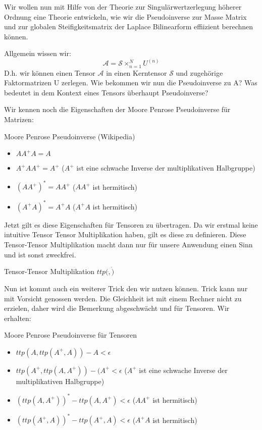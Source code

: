 Wir wollen nun mit Hilfe von der Theorie zur Singulärwertzerlegung höherer Ordnung eine Theorie entwickeln, wie wir die Pseudoinverse zur Masse Matrix und zur globalen Steifigkeitsmatrix der Laplace Bilinearform effiizient berechnen können.

Allgemein wissen wir:
\begin{equation}
\mathcal{A} = \mathcal{S} \times_{n=1}^{N} U^{ (n) }
\end{equation}
D.h. wir können einen Tensor $\mathcal{A}$ in einen Kerntensor $\mathcal{S}$ und zugehörige Faktormatrizen U zerlegen. Wie bekommen wir nun die Pseudoinverse zu A? Was bedeutet in dem Kontext eines Tensors überhaupt Pseudoinverse?

Wir kennen noch die Eigenschaften der Moore Penrose Pseudoinverse für Matrizen:
\begin{Lemma} Moore Penrose Pseudoinverse (Wikipedia) 
\begin{itemize}
\item $AA^{+}A=A$
\item $A^{+}AA^{+}=A^{+}$ ($A^{+}$ ist eine schwache Inverse der multiplikativen Halbgruppe)
\item $(AA^{+})^{*}=AA^{+}$ ($AA^{+}$ ist hermitisch)
\item $(A^{+}A)^{*}=A^{+}A$ ($A^{+}A$ ist hermitisch)
\end{itemize}
\end{Lemma}

Jetzt gilt es diese Eigenschaften für Tensoren zu übertragen. Da wir erstmal keine intuitive Tensor Tensor Multiplikation haben, gilt es diese zu definieren. Diese Tensor-Tensor Multiplikation macht dann nur für unsere Anwendung einen Sinn und ist sonst zweckfrei.
\begin{Definition} Tensor-Tensor Multiplikation $ttp(\dot,\dot)$
\end{Definition}

Nun ist kommt auch ein weiterer Trick den wir nutzen können. Trick kann nur mit Vorsicht genossen werden. Die Gleichheit ist mit einem Rechner nicht zu erzielen, daher wird die Bemerkung abgeschwächt und für Tensoren. Wir erhalten:
\begin{Lemma} Moore Penrose Pseudoinverse für Tensoren 
\begin{itemize}
\item $ttp(A,ttp(A^{+},A))-A < \epsilon$
\item $ttp(A^{+},ttp(A,A^{+}))-(A^{+}< \epsilon $ ($A^{+}$ ist eine schwache Inverse der multiplikativen Halbgruppe)
\item $(ttp(A,A^{+}))^{*}-ttp(A,A^{+}) < \epsilon $ ($AA^{+}$ ist hermitisch)
\item $(ttp(A^{+},A))^{*}-ttp(A^{+},A) < \epsilon $ ($A^{+}A$ ist hermitisch)
\end{itemize}
\end{Lemma}

